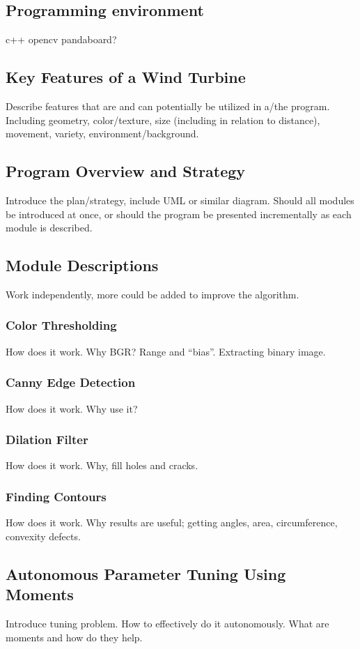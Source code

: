 \documentclass[a4paper,10pt]{article}
\begin{document}
  \subsection{Programming environment}
  c++ opencv pandaboard?
  \subsection{Key Features of a Wind Turbine}
  Describe features that are and can potentially be utilized in a/the program. Including geometry, color/texture, size (including in relation to distance), movement, variety, environment/background.
  \subsection{Program Overview and Strategy}
  Introduce the plan/strategy, include UML or similar diagram. Should all modules be introduced at once, or should the program be presented incrementally as each module is described.
  \subsection{Module Descriptions}
  Work independently, more could be added to improve the algorithm.
    \subsubsection{Color Thresholding}
    How does it work. Why BGR? Range and ``bias''. Extracting binary image.
    \subsubsection{Canny Edge Detection}
    How does it work. Why use it?
    \subsubsection{Dilation Filter}
    How does it work. Why, fill holes and cracks.
    \subsubsection{Finding Contours}
    How does it work. Why results are useful; getting angles, area, circumference, convexity defects.
  \subsection{Autonomous Parameter Tuning Using Moments}
  Introduce tuning problem. How to effectively do it autonomously. What are moments and how do they help.
\end{document}
